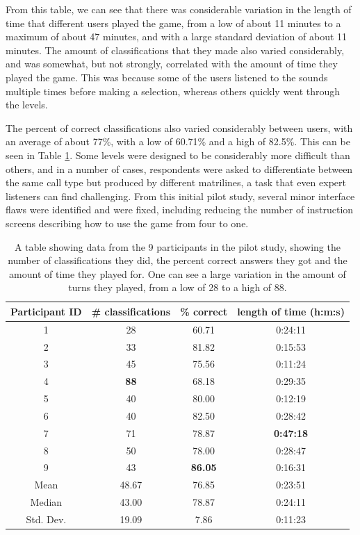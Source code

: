 \documentclass[12pt,oneside]{book}
\begin{document}
From this table, we can see that there was considerable variation in
the length of time that different users played the game, from a low of
about 11 minutes to a maximum of about 47 minutes, and with a large
standard deviation of about 11 minutes.  The amount of classifications
that they made also varied considerably, and was somewhat, but not
strongly, correlated with the amount of time they played the game.  This
was because some of the users listened to the sounds multiple times
before making a selection, whereas others quickly went through the levels.

The percent of correct classifications also varied considerably
between users, with an average of about 77\%, with a low of 60.71\%
and a high of 82.5\%.  This can be seen in Table
\ref{table:pilotStudy}.  Some levels were designed to be considerably
more difficult than others, and in a number of cases, respondents were
asked to differentiate between the same call type but produced by
different matrilines, a task that even expert listeners can find
challenging.  From this initial pilot study, several minor interface
flaws were identified and were fixed, including reducing the number of
instruction screens describing how to use the game from four to one.

\begin{table}
\begin{tabular}{|c|c|c|c|}
\hline
Participant ID & \# classifications & \% correct & length of time (h:m:s) \\
\hline
1              &    28      &       60.71   &       0:24:11 \\                 
2              &    33      &       81.82   &       0:15:53 \\
3              &    45      &       75.56   &       0:11:24 \\
4              &    \textbf{88}      &       68.18   &       0:29:35 \\
5              &    40      &       80.00   &       0:12:19 \\
6              &    40      &       82.50   &       0:28:42 \\
7              &    71      &       78.87   &       \textbf{0:47:18} \\
8              &    50      &       78.00   &       0:28:47 \\
9              &    43      &       \textbf{86.05}   &       0:16:31 \\
\hline
Mean	       &    48.67	&       76.85	&       0:23:51 \\
Median	       &    43.00	&       78.87	&       0:24:11 \\
Std. Dev.	   &    19.09	&       7.86	&       0:11:23 \\
\hline
\end{tabular}
\caption{A table showing data from the 9 participants in the pilot
  study, showing the number of classifications they did, the percent
  correct answers they got and the amount of time they played for.
  One can see a large variation in the amount of turns they played,
  from a low of 28 to a high of 88.}
\label{table:pilotStudy}
\end{table}
\end{document}
